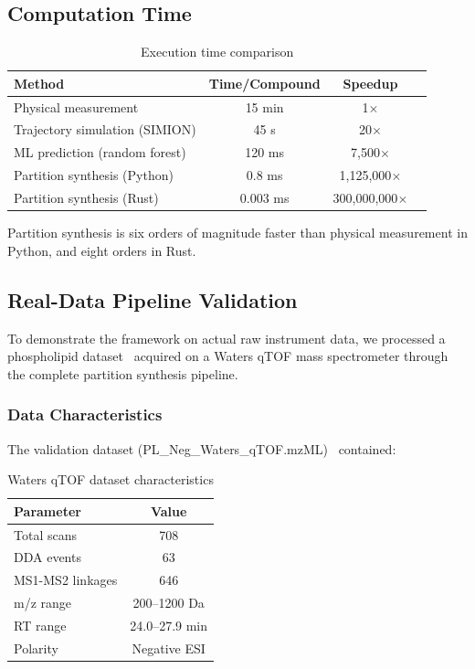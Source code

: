 \documentclass[twocolumn,10pt]{article}
\begin{document}
\subsection{Computation Time}

\begin{table}[H]
\centering
\caption{Execution time comparison}
\label{tab:time}
\begin{tabular}{lccc}
\toprule
\textbf{Method} & \textbf{Time/Compound} & \textbf{Speedup} \\
\midrule
Physical measurement & 15 min & 1$\times$ \\
Trajectory simulation (SIMION) & 45 s & 20$\times$ \\
ML prediction (random forest) & 120 ms & 7,500$\times$ \\
Partition synthesis (Python) & 0.8 ms & 1,125,000$\times$ \\
Partition synthesis (Rust) & 0.003 ms & 300,000,000$\times$ \\
\bottomrule
\end{tabular}
\end{table}

Partition synthesis is six orders of magnitude faster than physical measurement in Python, and eight orders in Rust.

\subsection{Real-Data Pipeline Validation}

To demonstrate the framework on actual raw instrument data, we processed a phospholipid dataset~\cite{han2012lipidomics, shevchenko2010lipidomics} acquired on a Waters qTOF mass spectrometer through the complete partition synthesis pipeline.

\subsubsection{Data Characteristics}

The validation dataset (PL\_Neg\_Waters\_qTOF.mzML)~\cite{martens2011mzml} contained:

\begin{table}[H]
\centering
\caption{Waters qTOF dataset characteristics}
\label{tab:waters_data}
\begin{tabular}{lc}
\toprule
\textbf{Parameter} & \textbf{Value} \\
\midrule
Total scans & 708 \\
DDA events & 63 \\
MS1-MS2 linkages & 646 \\
m/z range & 200--1200 Da \\
RT range & 24.0--27.9 min \\
Polarity & Negative ESI \\
\bottomrule
\end{tabular}
\end{table}
\end{document}
